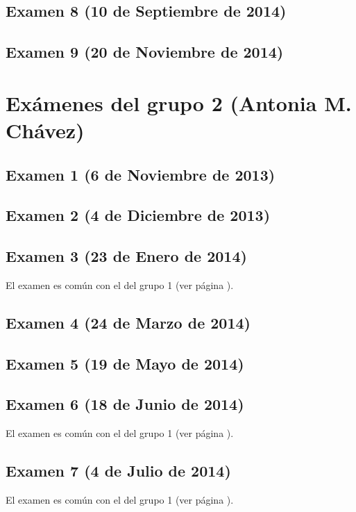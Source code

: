 \documentclass[a4paper,12pt,twoside]{book}
\begin{document}
\subsection{Examen 8 (10 de Septiembre de 2014)}
 \label{examen_13_14_3_8}
\subsection{Examen 9 (20 de Noviembre de 2014)}
 \label{examen_13_14_3_9}

\section{Exámenes del grupo 2 (Antonia M. Chávez)}
\subsection{Examen 1 (6 de Noviembre de 2013)}
\subsection{Examen 2 (4 de Diciembre de 2013)}
\subsection{Examen 3 (23 de Enero de 2014)}
El examen es común con el del grupo 1 (ver página \pageref{examen_13_14_3_3}).
\subsection{Examen 4 (24 de Marzo de 2014)}
\subsection{Examen 5 (19 de Mayo de 2014)}
\subsection{Examen 6 (18 de Junio de 2014)}
El examen es común con el del grupo 1 (ver página \pageref{examen_13_14_3_6}).
\subsection{Examen 7 (4 de Julio de 2014)}
El examen es común con el del grupo 1 (ver página \pageref{examen_13_14_3_7}).
\end{document}
